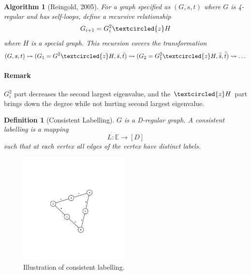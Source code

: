 \documentclass[11pt, letter]{book}
\newtheorem{algorithm}{Algorithm}[chapter]
\newtheorem{definition}{Definition}[chapter]
\begin{document}
\begin{mdframed}
	\begin{algorithm}[Reingold, 2005]
		For a graph specified as $(G, s, t)$ where $G$ is 4-regular and has self-loops, define a recursive relationship 
		\begin{equation}
			G_{i + 1} = G_i ^2 \textcircled{z} H
		\end{equation}
		where $H$ is a special graph. This recursion covers the transformation
		\begin{equation}
			(G, s, t) \leadsto (G_1 = G^2 \textcircled{z} H, \bar s, \bar t) \leadsto (G_2 = G_1^2 \textcircled{z} H, \bar{\bar{s}}, \bar{\bar{t}} ) \leadsto \dots
		\end{equation}
	\end{algorithm}
	\paragraph{Remark} $G_i^2$ part decreases the second largest eigenvalue, and the $\textcircled{z} H$ part brings down the degree while not hurting second largest eigenvalue. 
\end{mdframed}

\begin{definition}[Consistent Labelling]
	$G$ is a D-regular graph. A consistent labelling is a mapping 
	\begin{equation}
		L: \mathbb E \rightarrow [D]
	\end{equation}
	such that at each vertex all edges of the vertex have distinct labels. 
\end{definition}

\begin{figure}
	\centering
	\includegraphics[width=0.5\textwidth]{figs/consistentlabelling-1.png}
	\caption{Illustration of consistent labelling.\label{fig:consistent-labeling-1}}
\end{figure}
\end{document}
